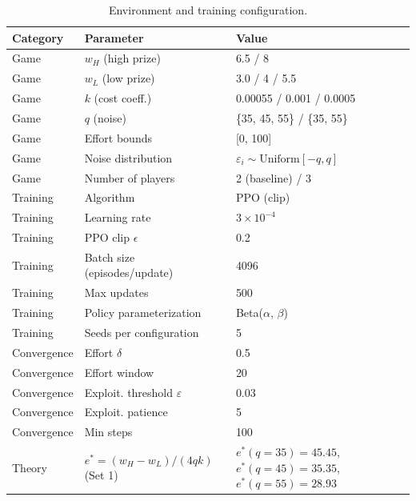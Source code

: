 \begin{table}[htbp]
\centering
\caption{Environment and training configuration.}
\label{tab:environment_config}
\begin{tabular}{lll}
\toprule
Category & Parameter & Value \\
\midrule
Game & $w_H$ (high prize) & 6.5 / 8 \\
Game & $w_L$ (low prize) & 3.0 / 4 / 5.5 \\
Game & $k$ (cost coeff.) & 0.00055 / 0.001 / 0.0005 \\
Game & $q$ (noise) & \{35, 45, 55\} / \{35, 55\} \\
Game & Effort bounds & [0, 100] \\
Game & Noise distribution & $\varepsilon_i \sim \text{Uniform}[-q, q]$ \\
Game & Number of players & 2 (baseline) / 3 \\
Training & Algorithm & PPO (clip) \\
Training & Learning rate & $3 \times 10^{-4}$ \\
Training & PPO clip $\epsilon$ & 0.2 \\
Training & Batch size (episodes/update) & 4096 \\
Training & Max updates & 500 \\
Training & Policy parameterization & Beta($\alpha$, $\beta$) \\
Training & Seeds per configuration & 5 \\
Convergence & Effort $\delta$ & 0.5 \\
Convergence & Effort window & 20 \\
Convergence & Exploit. threshold $\varepsilon$ & 0.03 \\
Convergence & Exploit. patience & 5 \\
Convergence & Min steps & 100 \\
Theory & $e^* = (w_H - w_L) / (4qk)$ (Set 1) & $e^*(q=35)=45.45$, $e^*(q=45)=35.35$, $e^*(q=55)=28.93$ \\
\bottomrule
\end{tabular}

\end{table}
